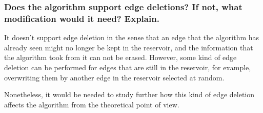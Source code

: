 \documentclass[12pt, a4paper]{article}
\begin{document}
\subsubsection*{Does the algorithm support edge deletions? If not, what modification would it need? Explain.}
It doesn't support edge deletion in the sense that an edge that the algorithm has already seen might no longer be kept in the reservoir, and the information that the algorithm took from it can not be erased. However, some kind of edge deletion can be performed for edges that are still in the reservoir, for example, overwriting them by another edge in the reservoir selected at random.

Nonetheless, it would be needed to study further how this kind of edge deletion affects the algorithm from the theoretical point of view.
\end{document}
